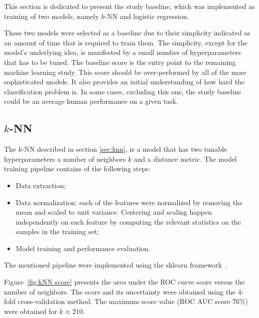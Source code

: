 This section is dedicated to present the study baseline, which was implemented as training of two models, namely $k$-NN and logistic regression.
 
These two models were selected as a baseline due to their simplicity indicated as an amount of time that is required to train them. The simplicity, except for the model's underlying idea, is manifested by a small number of hyperparameters that has to be tuned. The baseline score is the entry point to the remaining machine learning study. This score should be over-performed by all of the more sophisticated models. It also provides an initial understanding of how hard the classification problem is. In some cases, excluding this one, the study baseline could be an average human performance on a given task. 

\subsection{$k$-NN} 
\label{sec:KNN_result}

The $k$-NN described in section \ref{sec:knn}, is a model that has two tunable hyperparameters a number of neighbors $k$ and a distance metric. The model training pipeline contains of the following steps:

\begin{itemize}
    \item Data extraction;
    \item Data normalization: each of the features were normalized by removing the mean and scaled to unit variance. Centering and scaling happen independently on each feature by computing the relevant statistics on the samples in the training set;
    \item Model training and performance evaluation. 
\end{itemize}
The mentioned pipeline were implemented using the sklearn framework~\cite{sklearn}.  

Figure~\ref{fig:kNN score} presents the area under the ROC curve score versus the number of neighbors. The score and its uncertainty were obtained using the 4-fold cross-validation method. The maximum score value (ROC AUC score 76\%) were obtained for $k \approx 210$.  

